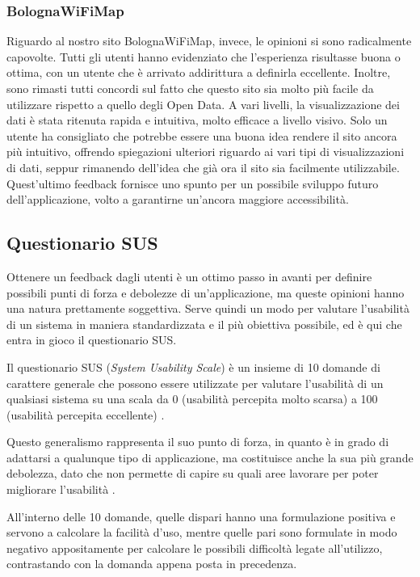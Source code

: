 \subsubsection{BolognaWiFiMap}
Riguardo al nostro sito BolognaWiFiMap, invece, le opinioni si sono radicalmente capovolte. Tutti gli utenti hanno evidenziato che l'esperienza risultasse buona o ottima, con un utente che è arrivato addirittura a definirla eccellente. Inoltre, sono rimasti tutti concordi sul fatto che questo sito sia molto più facile da utilizzare rispetto a quello degli Open Data. A vari livelli, la visualizzazione dei dati è stata ritenuta rapida e intuitiva, molto efficace a livello visivo. Solo un utente ha consigliato che potrebbe essere una buona idea rendere il sito ancora più intuitivo, offrendo spiegazioni ulteriori riguardo ai vari tipi di visualizzazioni di dati, seppur rimanendo dell'idea che già ora il sito sia facilmente utilizzabile. Quest'ultimo feedback fornisce uno spunto per un possibile sviluppo futuro dell'applicazione, volto a garantirne un'ancora maggiore accessibilità.

\subsection{Questionario SUS}
Ottenere un feedback dagli utenti è un ottimo passo in avanti per definire possibili punti di forza e debolezze di un'applicazione, ma queste opinioni hanno una natura prettamente soggettiva. Serve quindi un modo per valutare l'usabilità di un sistema in maniera standardizzata e il più obiettiva possibile, ed è qui che entra in gioco il questionario SUS.

Il questionario SUS (\textit{System Usability Scale}) è un insieme di 10 domande di carattere generale che possono essere utilizzate per valutare l'usabilità di un qualsiasi sistema su una scala da 0 (usabilità percepita molto scarsa) a 100 (usabilità percepita eccellente) \cite{SUS}.

Questo generalismo rappresenta il suo punto di forza, in quanto è in grado di adattarsi a qualunque tipo di applicazione, ma costituisce anche la sua più grande debolezza, dato che non permette di capire su quali aree lavorare per poter migliorare l'usabilità \cite{SUS}.

All'interno delle 10 domande, quelle dispari hanno una formulazione positiva e servono a calcolare la facilità d'uso, mentre quelle pari sono formulate in modo negativo appositamente per calcolare le possibili difficoltà legate all'utilizzo, contrastando con la domanda appena posta in precedenza.

